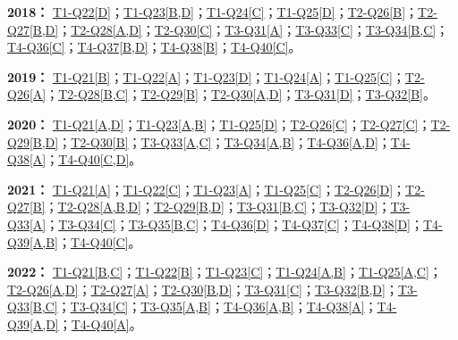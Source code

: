 \documentclass[11pt,a4paper]{article}
\begin{document}
\noindent\textbf{2018：} \hyperref[idx-2018-T1-Q22]{T1-Q22[D]}；\hyperref[idx-2018-T1-Q23]{T1-Q23[B,D]}；\hyperref[idx-2018-T1-Q24]{T1-Q24[C]}；\hyperref[idx-2018-T1-Q25]{T1-Q25[D]}；\hyperref[idx-2018-T2-Q26]{T2-Q26[B]}；\hyperref[idx-2018-T2-Q27]{T2-Q27[B,D]}；\hyperref[idx-2018-T2-Q28]{T2-Q28[A,D]}；\hyperref[idx-2018-T2-Q30]{T2-Q30[C]}；\hyperref[idx-2018-T3-Q31]{T3-Q31[A]}；\hyperref[idx-2018-T3-Q33]{T3-Q33[C]}；\hyperref[idx-2018-T3-Q34]{T3-Q34[B,C]}；\hyperref[idx-2018-T4-Q36]{T4-Q36[C]}；\hyperref[idx-2018-T4-Q37]{T4-Q37[B,D]}；\hyperref[idx-2018-T4-Q38]{T4-Q38[B]}；\hyperref[idx-2018-T4-Q40]{T4-Q40[C]}。\par\smallskip
\noindent\textbf{2019：} \hyperref[idx-2019-T1-Q21]{T1-Q21[B]}；\hyperref[idx-2019-T1-Q22]{T1-Q22[A]}；\hyperref[idx-2019-T1-Q23]{T1-Q23[D]}；\hyperref[idx-2019-T1-Q24]{T1-Q24[A]}；\hyperref[idx-2019-T1-Q25]{T1-Q25[C]}；\hyperref[idx-2019-T2-Q26]{T2-Q26[A]}；\hyperref[idx-2019-T2-Q28]{T2-Q28[B,C]}；\hyperref[idx-2019-T2-Q29]{T2-Q29[B]}；\hyperref[idx-2019-T2-Q30]{T2-Q30[A,D]}；\hyperref[idx-2019-T3-Q31]{T3-Q31[D]}；\hyperref[idx-2019-T3-Q32]{T3-Q32[B]}。\par\smallskip
\noindent\textbf{2020：} \hyperref[idx-2020-T1-Q21]{T1-Q21[A,D]}；\hyperref[idx-2020-T1-Q23]{T1-Q23[A,B]}；\hyperref[idx-2020-T1-Q25]{T1-Q25[D]}；\hyperref[idx-2020-T2-Q26]{T2-Q26[C]}；\hyperref[idx-2020-T2-Q27]{T2-Q27[C]}；\hyperref[idx-2020-T2-Q29]{T2-Q29[B,D]}；\hyperref[idx-2020-T2-Q30]{T2-Q30[B]}；\hyperref[idx-2020-T3-Q33]{T3-Q33[A,C]}；\hyperref[idx-2020-T3-Q34]{T3-Q34[A,B]}；\hyperref[idx-2020-T4-Q36]{T4-Q36[A,D]}；\hyperref[idx-2020-T4-Q38]{T4-Q38[A]}；\hyperref[idx-2020-T4-Q40]{T4-Q40[C,D]}。\par\smallskip
\noindent\textbf{2021：} \hyperref[idx-2021-T1-Q21]{T1-Q21[A]}；\hyperref[idx-2021-T1-Q22]{T1-Q22[C]}；\hyperref[idx-2021-T1-Q23]{T1-Q23[A]}；\hyperref[idx-2021-T1-Q25]{T1-Q25[C]}；\hyperref[idx-2021-T2-Q26]{T2-Q26[D]}；\hyperref[idx-2021-T2-Q27]{T2-Q27[B]}；\hyperref[idx-2021-T2-Q28]{T2-Q28[A,B,D]}；\hyperref[idx-2021-T2-Q29]{T2-Q29[B,D]}；\hyperref[idx-2021-T3-Q31]{T3-Q31[B,C]}；\hyperref[idx-2021-T3-Q32]{T3-Q32[D]}；\hyperref[idx-2021-T3-Q33]{T3-Q33[A]}；\hyperref[idx-2021-T3-Q34]{T3-Q34[C]}；\hyperref[idx-2021-T3-Q35]{T3-Q35[B,C]}；\hyperref[idx-2021-T4-Q36]{T4-Q36[D]}；\hyperref[idx-2021-T4-Q37]{T4-Q37[C]}；\hyperref[idx-2021-T4-Q38]{T4-Q38[D]}；\hyperref[idx-2021-T4-Q39]{T4-Q39[A,B]}；\hyperref[idx-2021-T4-Q40]{T4-Q40[C]}。\par\smallskip
\noindent\textbf{2022：} \hyperref[idx-2022-T1-Q21]{T1-Q21[B,C]}；\hyperref[idx-2022-T1-Q22]{T1-Q22[B]}；\hyperref[idx-2022-T1-Q23]{T1-Q23[C]}；\hyperref[idx-2022-T1-Q24]{T1-Q24[A,B]}；\hyperref[idx-2022-T1-Q25]{T1-Q25[A,C]}；\hyperref[idx-2022-T2-Q26]{T2-Q26[A,D]}；\hyperref[idx-2022-T2-Q27]{T2-Q27[A]}；\hyperref[idx-2022-T2-Q30]{T2-Q30[B,D]}；\hyperref[idx-2022-T3-Q31]{T3-Q31[C]}；\hyperref[idx-2022-T3-Q32]{T3-Q32[B,D]}；\hyperref[idx-2022-T3-Q33]{T3-Q33[B,C]}；\hyperref[idx-2022-T3-Q34]{T3-Q34[C]}；\hyperref[idx-2022-T3-Q35]{T3-Q35[A,B]}；\hyperref[idx-2022-T4-Q36]{T4-Q36[A,B]}；\hyperref[idx-2022-T4-Q38]{T4-Q38[A]}；\hyperref[idx-2022-T4-Q39]{T4-Q39[A,D]}；\hyperref[idx-2022-T4-Q40]{T4-Q40[A]}。\par\smallskip
\end{document}
